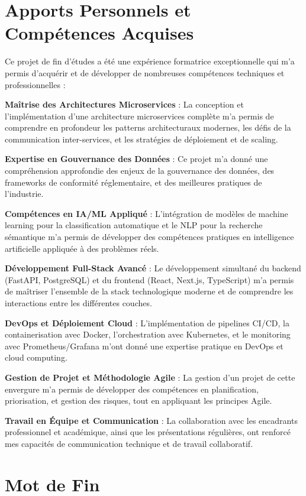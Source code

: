 \section*{Apports Personnels et Compétences Acquises}

Ce projet de fin d'études a été une expérience formatrice exceptionnelle qui m'a permis d'acquérir et de développer de nombreuses compétences techniques et professionnelles :

\textbf{Maîtrise des Architectures Microservices} : La conception et l'implémentation d'une architecture microservices complète m'a permis de comprendre en profondeur les patterns architecturaux modernes, les défis de la communication inter-services, et les stratégies de déploiement et de scaling.

\textbf{Expertise en Gouvernance des Données} : Ce projet m'a donné une compréhension approfondie des enjeux de la gouvernance des données, des frameworks de conformité réglementaire, et des meilleures pratiques de l'industrie.

\textbf{Compétences en IA/ML Appliqué} : L'intégration de modèles de machine learning pour la classification automatique et le NLP pour la recherche sémantique m'a permis de développer des compétences pratiques en intelligence artificielle appliquée à des problèmes réels.

\textbf{Développement Full-Stack Avancé} : Le développement simultané du backend (FastAPI, PostgreSQL) et du frontend (React, Next.js, TypeScript) m'a permis de maîtriser l'ensemble de la stack technologique moderne et de comprendre les interactions entre les différentes couches.

\textbf{DevOps et Déploiement Cloud} : L'implémentation de pipelines CI/CD, la containerisation avec Docker, l'orchestration avec Kubernetes, et le monitoring avec Prometheus/Grafana m'ont donné une expertise pratique en DevOps et cloud computing.

\textbf{Gestion de Projet et Méthodologie Agile} : La gestion d'un projet de cette envergure m'a permis de développer des compétences en planification, priorisation, et gestion des risques, tout en appliquant les principes Agile.

\textbf{Travail en Équipe et Communication} : La collaboration avec les encadrants professionnel et académique, ainsi que les présentations régulières, ont renforcé mes capacités de communication technique et de travail collaboratif.

\section*{Mot de Fin}

